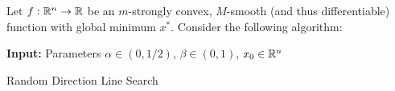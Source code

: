 \documentclass[12pt]{article}
\begin{document}
	Let $f: \mathbb{R}^n \to \mathbb{R}$ be an $m$-strongly convex, $M$-smooth (and thus differentiable) function with global minimum $x^*$. 
%
	Consider the following algorithm:

	\begin{algorithm}[H]
	\SetAlgoLined
	\textbf{Input:} Parameters $\alpha \in (0,1/2)$, $\beta \in (0,1)$, $x_0 \in \mathbb{R}^n$\;
	\caption{Random Direction Line Search}
	\end{algorithm}
\end{document}
